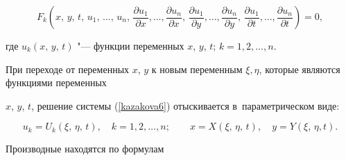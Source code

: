 \begin{equation}

\label{kazakova6}

F_k \left(x,\,y,\,t,\,u_1,\,\ldots,\,u_n,\,

\frac{\displaystyle\partial u_1}{\displaystyle\partial x},\ldots,

\frac{\displaystyle\partial u_n}{\displaystyle\partial x},\,

\frac{\displaystyle\partial u_1}{\displaystyle\partial y},\ldots,

\frac{\displaystyle\partial u_n}{\displaystyle\partial y},\,

\frac{\displaystyle\partial u_1}{\displaystyle\partial t},\ldots,

\frac{\displaystyle\partial u_n}{\displaystyle\partial

t}\right)=0, 

\end{equation}

где $u_k(x,\,y,\,t)$ "--- функции переменных $x$, $y$, $t$; $k=1, 2, \dots, n.$



При переходе от переменных $x$, $y$ к новым переменным ${\xi}, {\eta}$, которые являются функциями переменных

$x$, $y$, $t$, решение системы (\ref{kazakova6}) отыскивается в~параметрическом виде:

\begin{equation}\label{kazakova2}

u_k=U_k(\xi,\,\eta,\,t),\quad k=1, 2, \dots, n; \qquad

x=X(\xi,\,\eta,\,t),\quad y=Y(\xi,\,\eta,t).

\end{equation}



Производные находятся по формулам


